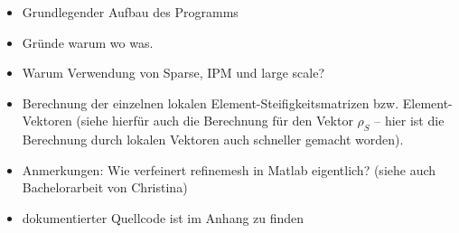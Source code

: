 \label{kap:5}


\begin{itemize}
\item Grundlegender Aufbau des Programms
\item Gründe warum wo was.
\item Warum Verwendung von Sparse, IPM und large scale?
\item Berechnung der einzelnen lokalen Element-Steifigkeitsmatrizen bzw. Element-Vektoren (siehe hierfür auch die Berechnung für den Vektor $\rho_S$ – hier ist die Berechnung durch lokalen Vektoren auch schneller gemacht worden).
\item Anmerkungen: Wie verfeinert refinemesh in Matlab eigentlich? (siehe auch Bachelorarbeit von Christina)
\item dokumentierter Quellcode ist im Anhang zu finden
\end{itemize}

\newpage

